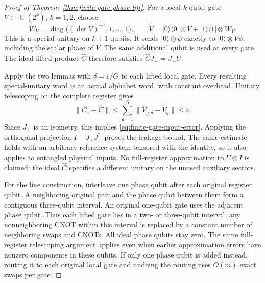 \documentclass[11pt]{article}
\begin{document}
\begin{proof}[Proof of Theorem~\ref{thm:finite-gate-phase-lift}]
For a local $k$-qubit gate $V\in\operatorname{U}(2^k)$, $k=1,2$, choose
\begin{equation}\label{eq:finite-gate-local-phase-lift}
 W_V=\operatorname{diag}\bigl((\det V)^{-1},1,\ldots,1\bigr),\qquad
 \widehat V=|0\rangle\langle0|\otimes V
             +|1\rangle\langle1|\otimes W_V.
\end{equation}
This is a special unitary on $k+1$ qubits. It sends
$|0\rangle\otimes\psi$ exactly to $|0\rangle\otimes V\psi$, including
the scalar phase of $V$. The same additional qubit is used at every gate.
The ideal lifted product $\widehat C$ therefore satisfies
$\widehat C J_+=J_+U$.

Apply the two lemmas with $\delta=\varepsilon/G$ to each lifted local gate.
Every resulting special-unitary word is an actual alphabet word, with
constant overhead. Unitary telescoping on the complete register gives
\begin{equation}
 \|C_\varepsilon-\widehat C\|
 \leq\sum_{g=1}^G\|\widehat V_{g,\delta}-\widehat V_g\|
 \leq\varepsilon.
\end{equation}
Since $J_+$ is an isometry, this implies \eqref{eq:finite-gate-input-error}.
Applying the orthogonal projection $I-J_+J_+^\dagger$ proves the leakage
bound. The same estimate holds with an arbitrary reference system tensored
with the identity, so it also applies to entangled physical inputs.
No full-register approximation to $U\otimes I$ is claimed: the ideal
$\widehat C$ specifies a different unitary on the unused auxiliary sectors.

For the line construction, interleave one phase qubit after each original
register qubit. A neighboring original pair and the phase qubit between
them form a contiguous three-qubit interval. An original one-qubit gate uses
the adjacent phase qubit. Thus each lifted gate lies in a two- or three-qubit
interval; any nonneighboring CNOT within this interval is replaced by a
constant number of neighboring swaps and CNOTs. All ideal phase qubits stay
zero. The same full-register telescoping argument applies even when earlier
approximation errors have nonzero components in these qubits.
If only one phase qubit is added instead, routing it to each original local
gate and undoing the routing uses $O(m)$ exact swaps per gate.
\end{proof}
\end{document}
